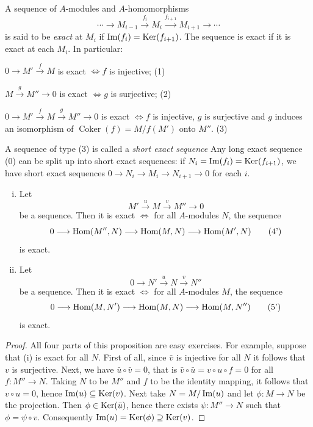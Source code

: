 A sequence of $A$-modules and $A$-homomorphisms
\[
    \cdots \to M_{i-1} \stackrel{f_i}{\longrightarrow} M_i \stackrel{f_{i+1}}{\longrightarrow} M_{i+1} \longrightarrow \cdots \tag{0}
\]
is said to be \emph{exact} at $M_i$ if $\operatorname{Im}(f_i) = \operatorname{Ker}(f_{i+1})$. The sequence is exact if it is exact at each $M_i$. In particular:

$0 \longrightarrow M' \stackrel{f}{\longrightarrow} M$ is exact $\iff f$ is injective; \hfill (1)

$M \stackrel{g}{\longrightarrow} M'' \longrightarrow 0$ is exact $\iff g$ is surjective; \hfill (2)

$0 \longrightarrow M' \stackrel{f}{\longrightarrow} M \stackrel{g}{\longrightarrow} M'' \longrightarrow 0$ is exact $\iff f$ is injective, $g$ is surjective and $g$ induces an isomorphism of $\operatorname{Coker}(f) = M/f(M')$ onto $M''$. \hfill (3)

A sequence of type (3) is called a \emph{short exact sequence} Any long exact sequence (0) can be split up into short exact sequences: if $N_i = \operatorname{Im}(f_i) = \operatorname{Ker}(f_{i+1})$, we have short exact sequences $0 \longrightarrow N_i \longrightarrow M_i \longrightarrow N_{i+1} \longrightarrow 0$ for each $i$.

\begin{proposition}\label{prop:exact-hom}
\begin{enumerate}[i)]
    \item Let \[M' \stackrel{u}{\longrightarrow} M \stackrel{v}{\longrightarrow} M'' \longrightarrow 0 \tag{4}\] be a sequence. Then it is exact $\iff$ for all $A$-modules $N$, the sequence
    \[
        0 \longrightarrow \operatorname{Hom}(M'', N) \longrightarrow \operatorname{Hom}(M, N) \longrightarrow \operatorname{Hom}(M', N) \tag{4'}
    \]
    is exact.
    \item Let \[0 \longrightarrow N' \stackrel{u}{\longrightarrow} N \stackrel{v}{\longrightarrow} N''\tag{5}\] be a sequence. Then it is exact $\iff$ for all $A$-modules $M$, the sequence
    \[
        0 \longrightarrow \operatorname{Hom}(M, N') \longrightarrow \operatorname{Hom}(M, N) \longrightarrow \operatorname{Hom}(M, N'')\tag{5'}
    \]
    is exact.
\end{enumerate}
\end{proposition}

\begin{proof}
All four parts of this proposition are easy exercises. For example, suppose that (i) is exact for all $N$. First of all, since $\bar{v}$ is injective for all $N$ it follows that $v$ is surjective. Next, we have $\bar{u} \circ \bar{v} = 0$, that is $\bar{v} \circ \bar{u} = v \circ u \circ f = 0$ for all $f \colon M'' \to N$. Taking $N$ to be $M''$ and $f$ to be the identity mapping, it follows that $v \circ u = 0$, hence $\operatorname{Im}(u) \subseteq \operatorname{Ker}(v)$. Next take $N = M/\operatorname{Im}(u)$ and let $\phi \colon M \to N$ be the projection. Then $\phi \in \operatorname{Ker}(\bar{u})$, hence there exists $\psi \colon M'' \to N$ such that $\phi = \psi \circ v$. Consequently $\operatorname{Im}(u) = \operatorname{Ker}(\phi) \supseteq \operatorname{Ker}(v)$.
\end{proof}

